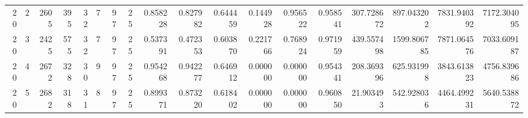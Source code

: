 \begin{tabular}{rrrrrrrrrrrrrrrrrr}
20 & 2 & 2605 & 395 & 32 & 7 & 97 & 25 & 0.858228 & 0.827982 & 0.644459 & 0.144928 & 0.956522 & 0.958541 & 307.728672 & 897.043202 & 7831.940392 & 7172.304095 \\
20 & 3 & 2425 & 575 & 32 & 7 & 97 & 25 & 0.537391 & 0.472353 & 0.603870 & 0.221766 & 0.768924 & 0.971959 & 439.557498 & 1599.806785 & 7871.064576 & 7033.609187 \\
20 & 4 & 2672 & 328 & 30 & 9 & 97 & 25 & 0.954268 & 0.942277 & 0.646912 & 0.000000 & 0.000000 & 0.954341 & 208.369396 & 625.931998 & 3843.613823 & 4756.839686 \\
20 & 5 & 2682 & 318 & 31 & 8 & 97 & 25 & 0.899371 & 0.873220 & 0.618402 & 0.000000 & 0.000000 & 0.960850 & 21.903493 & 542.928036 & 4464.499231 & 5640.538872 \\
\bottomrule
\end{tabular}
